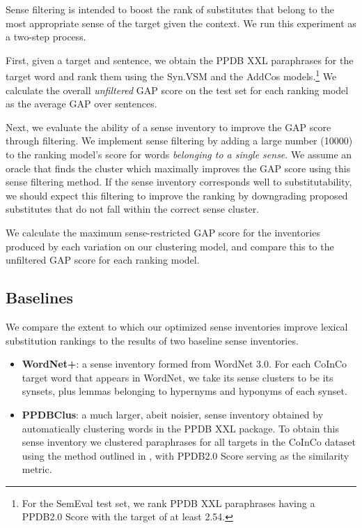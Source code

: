 \documentclass[11pt]{article}
\begin{document}
	Sense filtering is intended to boost the rank of substitutes that belong to the most appropriate sense of the target given the context. We run this experiment as a two-step process.
	
	First, given a target and sentence, we obtain the PPDB XXL paraphrases for the target word and rank them using the Syn.VSM and the AddCos models.\footnote{For the SemEval test set, we rank PPDB XXL paraphrases having a PPDB2.0 Score with the target of at least 2.54.} We calculate the overall \textit{unfiltered} GAP score on the test set for each ranking model as the average GAP over sentences.
	
	Next, we evaluate the ability of a sense inventory to improve the GAP score through filtering. We implement sense filtering by adding a large number (10000) to the ranking model's score for words \textit{belonging to a single sense}. We assume an oracle that finds the cluster which maximally improves the GAP score using this sense filtering method. If the sense inventory corresponds well to substitutability, we should expect this filtering to improve the ranking by downgrading proposed substitutes that do not fall within the correct sense cluster. 
	
	We calculate the maximum sense-restricted GAP score for the inventories produced by each variation on our clustering model, and compare this to the unfiltered GAP score for each ranking model. 
	
	\subsection{Baselines}
	
	We compare the extent to which our optimized sense inventories improve lexical substitution rankings to the results of two baseline sense inventories.
	
	\begin{itemize}
		\item\textbf{WordNet+}: a sense inventory formed from WordNet 3.0. For each CoInCo target word that appears in WordNet, we take its sense clusters to be its synsets, plus lemmas belonging to hypernyms and hyponyms of each synset. 
		\item\textbf{PPDBClus}: a much larger, abeit noisier, sense inventory obtained by automatically clustering words in the PPDB XXL package. To obtain this sense inventory we clustered paraphrases for all targets in the CoInCo dataset using the method outlined in , with PPDB2.0 Score serving as the similarity metric. 
	\end{itemize}
	
\end{document}

